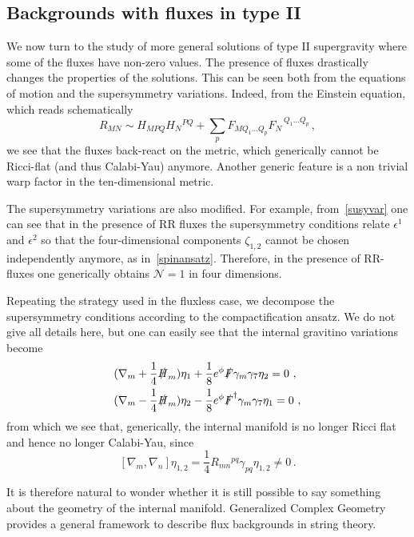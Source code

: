 \documentclass[debug]{phd}
\begin{document}
		\subsection{Backgrounds with fluxes in type II}
			We now turn to the study of more general solutions of type II supergravity where some of the fluxes have non-zero values. 
			The presence of fluxes drastically changes the properties of the solutions. This can be seen both from the equations of motion and the
supersymmetry variations.		
Indeed, from the Einstein equation, which reads schematically
\begin{equation}
R_{MN} \sim H_{MPQ}H_N{}^{PQ}+\sum_p F_{M Q_{1} \ldots Q_{p}} F_N{}^{\, Q_{1} \ldots Q_{p}} \, ,
\end{equation}
we see that the fluxes back-react on the metric, which generically cannot be Ricci-flat (and thus Calabi-Yau) anymore. 
Another generic feature is a non trivial warp factor in the ten-dimensional metric. 

The supersymmetry variations are also modified. For example, from~\eqref{susyvar} one can see that in the presence of RR fluxes the supersymmetry conditions relate $\epsilon^{1}$ and $\epsilon^2$ so that the four-dimensional components $\zeta_{1,2}$ cannot be chosen independently anymore, as in~\eqref{spinansatz}. Therefore, in the presence of RR-fluxes one generically obtains $\mathcal{N}=1$ in four dimensions. 
	

Repeating the strategy used in the fluxless case, we decompose the supersymmetry conditions according to the compactification
ansatz. We do not give all details here, but one can easily see that the internal gravitino variations become
%
\begin{equation}\label{intgravsplitagain}
\begin{split}
(\nabla_m+\frac14\slashed{H}_m)&\eta_1+\frac{1}{8} e^\phi\slashed{F}\gamma_m\gamma_7\eta_2 = 0\ , \\
(\nabla_m-\frac14\slashed{H}_m)&\eta_2-\frac{1}{8} e^\phi\slashed{F}^\dagger\gamma_m\gamma_7\eta_1 = 0\ , 
\end{split}
\end{equation}
%
from which we see that, generically, the internal manifold is no longer Ricci flat and hence no longer Calabi-Yau, since
\begin{equation}\label{susyintegr}
	[\nabla_m , \nabla_n ] \eta_{1,2} = \frac{1}{4} {R}_{mn}{}^{ pq} \gamma_{pq} \eta_{1,2} \neq 0 \, .
\end{equation}

It is therefore natural to wonder whether it is still possible
to say something about the geometry of the internal manifold.
Generalized Complex Geometry provides a general framework to describe flux backgrounds in string theory.

\end{document}
